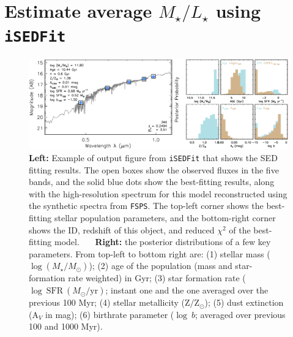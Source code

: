 \documentclass[fleqn,usenatbib]{mnras}
\def\logms{{$\log (M_{\star}/M_{\odot})$}}
\begin{document}
    
\section{Estimate average {$M_{\star}/L_{\star}$} using \texttt{iSEDFit}} 
    \label{app:sed} 

    \begin{figure}
        \begin{center}
        \includegraphics[width=\textwidth]{fig/redbcg_isedfit_example.pdf}
        \caption{
            \textbf{Left:} Example of output figure from \texttt{iSEDFit} that shows 
            the SED fitting results. 
            The open boxes show the observed fluxes in the five bands, and the solid 
            blue dots show the best-fitting results, along with the high-resolution
            spectrum for this model reconstructed using the synthetic spectra from
            \texttt{FSPS}. 
            The top-left corner shows the best-fitting stellar population parameters, 
            and the bottom-right corner shows the ID, redshift of this object, and 
            reduced $\chi^2$ of the best-fitting model.~~~
            \textbf{Right:} the posterior distributions of a few key
            parameters.
            From top-left to bottom right are: 
            (1) stellar mass (\logms{}); 
            (2) age of the population (mass and star-formation rate weighted) in Gyr; 
            (3) star formation rate ($\log\ \mathrm{SFR}\ (M_{\odot}/\mathrm{yr})$; 
            instant one and the one averaged over the previous 100 Myr; 
            (4) stellar metallicity ($\mathrm{Z}/\mathrm{Z}_{\odot}$); 
            (5) dust extinction ($\mathrm{A}_V$ in mag);
            (6) birthrate parameter ($\log\ b$; averaged over previous 100 and 
            1000 Myr).
            }
        \label{fig:ised_1}
        \end{center}
    \end{figure}
\end{document}
